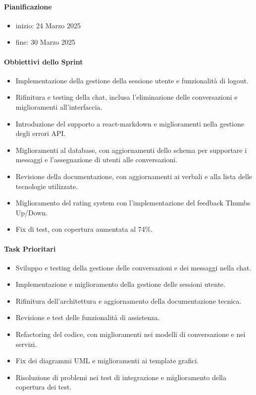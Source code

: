 \documentclass{article}
\begin{document}
            \paragraph{Pianificazione}
                \begin{itemize}
                    \item inizio: 24 Marzo 2025
                    \item fine: 30 Marzo 2025
                \end{itemize}
            
            \paragraph{Obbiettivi dello Sprint}
            \begin{itemize}
                \item Implementazione della gestione della sessione utente e funzionalità di logout.
                \item Rifinitura e testing della chat, inclusa l'eliminazione delle conversazioni e miglioramenti all’interfaccia.
                \item Introduzione del supporto a react-markdown e miglioramenti nella gestione degli errori API.
                \item Miglioramenti al database, con aggiornamenti dello schema per supportare i messaggi e l'assegnazione di utenti alle conversazioni.
                \item Revisione della documentazione, con aggiornamenti ai verbali e alla lista delle tecnologie utilizzate.
                \item Miglioramento del rating system con l'implementazione del feedback Thumbs Up/Down.
                \item Fix di test, con copertura aumentata al 74\%.
            \end{itemize}
            
            \paragraph{Task Prioritari}
            \begin{itemize}
                \item Sviluppo e testing della gestione delle conversazioni e dei messaggi nella chat.
                \item Implementazione e miglioramento della gestione delle sessioni utente.
                \item Rifinitura dell'architettura e aggiornamento della documentazione tecnica.
                \item Revisione e test delle funzionalità di assistenza.
                \item Refactoring del codice, con miglioramenti nei modelli di conversazione e nei servizi.
                \item Fix dei diagrammi UML e miglioramenti ai template grafici.
                \item Risoluzione di problemi nei test di integrazione e miglioramento della copertura dei test.
            \end{itemize}
            
\end{document}
